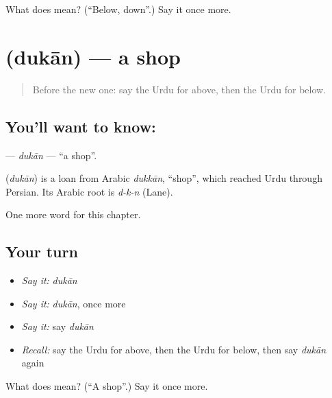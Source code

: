 \begin{tcolorbox}[breakable,colback=teal!4,colframe=teal!35!black,title={Before you move on}]
What does  mean? (\textquotedblleft{}Below, down\textquotedblright{}.) Say it once more.
\end{tcolorbox}
\section[\texorpdfstring{\ur{دکان} (dukān)}{دکان (dukān)}]{ (dukān) — a shop}

\label{lesson:UR-C79-dukan}



\begin{quote}
Before the new one: say the Urdu for above, then the Urdu for below.
\end{quote}

\subsection*{You'll want to know: }
\textbf{} — \emph{dukān} — \textquotedblleft{}a shop\textquotedblright{}.

\begin{cousinweb}
\textbf{} (\emph{dukān}) is a loan from Arabic \emph{dukkān}, \textquotedblleft{}shop\textquotedblright{}, which reached Urdu through Persian. Its Arabic root is \emph{d-k-n} (Lane).
\end{cousinweb}

\begin{grammarlens}[title={What you've built}]
One more word for this chapter.
\end{grammarlens}

\subsection*{Your turn}
\begin{itemize}
\raggedright
  \item \emph{Say it:} \emph{dukān}
  \item \emph{Say it:} \emph{dukān}, once more
  \item \emph{Say it:} say \emph{dukān}
  \item \emph{Recall:} say the Urdu for above, then the Urdu for below, then say \emph{dukān} again
\end{itemize}

\begin{tcolorbox}[breakable,colback=teal!4,colframe=teal!35!black,title={Before you move on}]
What does  mean? (\textquotedblleft{}A shop\textquotedblright{}.) Say it once more.
\end{tcolorbox}
